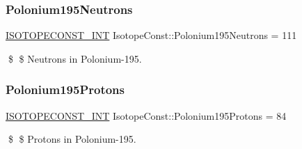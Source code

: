 \subsubsection{\texorpdfstring{Polonium195\+Neutrons}{Polonium195Neutrons}}
{\footnotesize\ttfamily \mbox{\hyperlink{group___isotope_const-_macros_ga5f18360b3e99483a35c32d789e62621c}{I\+S\+O\+T\+O\+P\+E\+C\+O\+N\+S\+T\+\_\+\+I\+NT}} Isotope\+Const\+::\+Polonium195\+Neutrons = 111}

\$ \$ Neutrons in Polonium-\/195. \mbox{\label{group___isotope_const-_polonium-_po195_gace0fe48cfbff6b9f3c9759d2aafa2f9a}} 
\subsubsection{\texorpdfstring{Polonium195\+Protons}{Polonium195Protons}}
{\footnotesize\ttfamily \mbox{\hyperlink{group___isotope_const-_macros_ga5f18360b3e99483a35c32d789e62621c}{I\+S\+O\+T\+O\+P\+E\+C\+O\+N\+S\+T\+\_\+\+I\+NT}} Isotope\+Const\+::\+Polonium195\+Protons = 84}

\$ \$ Protons in Polonium-\/195. 
